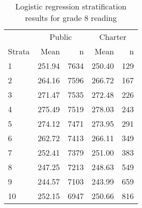 \begin{table}[ht]
\centering
\caption{Logistic regression stratification results for grade 8 reading} 
\label{g8read-circpsa10}
\begin{tabular}{lrr@{\extracolsep{.2cm}}rr}
  \hline
   & \multicolumn{2}{c}{Public} & \multicolumn{2}{c}{Charter} \\ \cline{2-3} \cline{4-5} Strata & Mean & n & Mean & n \\ \hline
1 & 251.94 & 7634 & 250.40 & 129 \\ 
  2 & 264.16 & 7596 & 266.72 & 167 \\ 
  3 & 271.47 & 7535 & 272.48 & 226 \\ 
  4 & 275.49 & 7519 & 278.03 & 243 \\ 
  5 & 274.12 & 7471 & 273.95 & 291 \\ 
  6 & 262.72 & 7413 & 266.11 & 349 \\ 
  7 & 252.41 & 7379 & 251.00 & 383 \\ 
  8 & 247.25 & 7213 & 248.63 & 549 \\ 
  9 & 244.57 & 7103 & 243.99 & 659 \\ 
  10 & 252.15 & 6947 & 250.66 & 816 \\ 
   \hline
\end{tabular}
\end{table}
